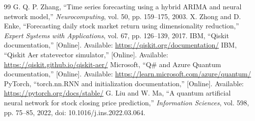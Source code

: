 \documentclass[conference]{IEEEtran}
\begin{document}
\begin{thebibliography}{99}
 G. Q. P. Zhang, ``Time series forecasting using a hybrid ARIMA and neural network model,'' \emph{Neurocomputing}, vol. 50, pp. 159--175, 2003.
 X. Zhong and D. Enke, ``Forecasting daily stock market return using dimensionality reduction,'' \emph{Expert Systems with Applications}, vol. 67, pp. 126--139, 2017.
 IBM, ``Qiskit documentation,'' [Online]. Available: \url{https://qiskit.org/documentation/}
 IBM, ``Qiskit Aer statevector simulator,'' [Online]. Available: \url{https://qiskit.github.io/qiskit-aer/}
 Microsoft, ``Q\# and Azure Quantum documentation,'' [Online]. Available: \url{https://learn.microsoft.com/azure/quantum/}
 PyTorch, ``torch.nn.RNN and initialization documentation,'' [Online]. Available: \url{https://pytorch.org/docs/stable/}
 G. Liu and W. Ma, ``A quantum artificial neural network for stock closing price prediction,'' \emph{Information Sciences}, vol. 598, pp. 75--85, 2022, doi: 10.1016/j.ins.2022.03.064.
\end{thebibliography}
\end{document}
